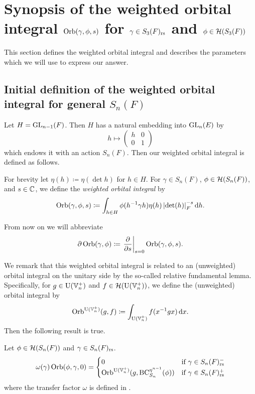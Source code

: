 \chapter{Synopsis of the weighted orbital integral $\operatorname{Orb}(\gamma, \phi, s)$ for $\gamma \in S_3(F)_{\mathrm{rs}}$ and $\phi \in \mathcal H(S_3(F))$}
\label{ch:orbital0}

This section defines the weighted orbital integral
and describes the parameters which we will use to express our answer.

\section{Initial definition of the weighted orbital integral for general $S_n(F)$}
Let $H = \operatorname{GL}_{n-1}(F)$.
Then $H$ has a natural embedding into $\operatorname{GL}_n(E)$ by
\[ h \mapsto \begin{pmatrix} h & 0 \\ 0 & 1 \end{pmatrix} \]
which endows it with an action $S_n(F)$.
Then our weighted orbital integral is defined as follows.
\begin{definition}
  \label{def:orbital0}
  For brevity let $\eta(h) \coloneqq \eta(\det h)$ for $h \in H$.
  For $\gamma \in S_n(F)$, $\phi \in \mathcal H(S_n(F))$, and $s \in \mathbb C$,
  we define the \emph{weighted orbital integral} by
  \[ \Orb(\gamma, \phi, s) \coloneqq
    \int_{h \in H} \phi(h\inv \gamma h) \eta(h)
    \left\lvert \det(h) \right\rvert_F^{-s} \odif h. \]
\end{definition}
\begin{definition}
  From now on we will abbreviate
  \[ \partial \operatorname{Orb}(\gamma, \phi)
    \coloneqq \left. \pdv{}{s} \right\rvert_{s=0} \operatorname{Orb}(\gamma, \phi, s). \]
\end{definition}

We remark that this weighted orbital integral is related to
an (unweighted) orbital integral on the unitary side
by the so-called relative fundamental lemma.
Specifically, for $g \in \operatorname{U}(\mathbb V_n^+)$ and $f \in \mathcal H(\operatorname{U}(\mathbb V_n^+))$,
we define the (unweighted) orbital integral by
\[ \Orb^{\U(\VV_n^+)}(g, f) \coloneqq \int_{\U(\VV_n^+)} f(x^{-1}gx) \odif x. \]
Then the following result is true.
\begin{theorem}
  \label{thm:rel_fundamental_lemma}
  Let $\phi \in \mathcal H(S_n(F))$ and $\gamma \in S_n(F)_{\mathrm{rs}}$.
  \[ \omega(\gamma) \operatorname{Orb}(\phi, \gamma, 0)
    = \begin{cases}
      0 & \text{if }\gamma \in S_n(F)_{\mathrm{rs}}^- \\
      \operatorname{Orb}^{\operatorname{U}(\mathbb V_n^+)}(g, \operatorname{BC}^{\eta^{n-1}}_{S_n}(\phi)) & \text{if } \gamma \in S_n(F)_{\mathrm{rs}}^+
    \end{cases}
  \]
  where the transfer factor $\omega$ is defined in .
\end{theorem}

